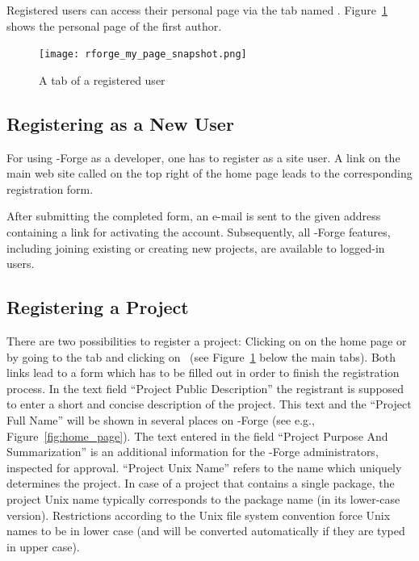 Registered users can access their personal
page via the tab named . Figure~\ref{fig:my_page} shows
the personal page of the first author.

\begin{figure}[th]
\centering
\texttt{[image: rforge\_my\_page\_snapshot.png]}
\caption{A  tab of a registered user}
\label{fig:my_page}
\end{figure}

\subsection{Registering as a New User}

For using \R{}-Forge as a developer, one has
to register as a site user. A link on the main web site called
 on the top right of the home page leads to the
corresponding registration form.

After submitting the completed form, an e-mail is sent to the given
address containing a link for activating the account. Subsequently,
all \R{}-Forge features, including joining existing or creating
new projects, are available to logged-in users.

\subsection{Registering a Project}

There are two possibilities to register a project: Clicking on
 on the home page or by going to the 
 tab and clicking on ~(see
Figure~\ref{fig:my_page} below the main tabs). Both links lead to a
form which has to be filled out in order to finish the registration
process. In the text field ``Project Public Description'' the
registrant is supposed to enter a short and concise description of the
project. This text and the ``Project Full Name'' will be shown in
several places on \R{}-Forge (see e.g., Figure~\ref{fig:home_page}). The text 
entered in the field ``Project Purpose And Summarization'' is an
additional information for the \R{}-Forge administrators, inspected
for approval. ``Project Unix
Name'' refers to the name which 
uniquely determines the project. In case of a project that contains a
single \R{} package, the project Unix name typically corresponds to
the package name (in its lower-case version). Restrictions according to
the Unix file system convention force Unix names to be in lower case
(and will be converted automatically if they are typed in upper case).

